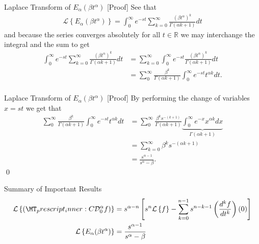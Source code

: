 \documentclass[pdf]{beamer}
\newcommand{\laplace}[1]{ \mathcal{L} \left\{ #1 \right\} }
\newcommand{\der}[3]{ \frac{d^{#3}#1}{d#2^{#3}} }
\newcommand{\capder}[3]{ \left( \prescript{C}{}{\mathcal{D}_{#1}^{#2}} #3 \right) }
\begin{document}
\begin{frame}{Laplace Transform of $E_\alpha(\beta t^\alpha)$ [Proof]}
See that
	\begin{align*}
		\laplace{ E_\alpha (\beta t^\alpha)} = \int_0^\infty e^{-st} \sum_{k=0}^\infty \frac{(\beta t^\alpha)^k}{\Gamma(\alpha k+1)} dt
	\end{align*}
	and because the series converges absolutely for all $ t \in \mathbb{R} $  we may interchange the integral
	and the sum to get
	\begin{align*}
		\int_0^\infty e^{-st} \sum_{k=0}^\infty \frac{(\beta t^\alpha)^k}{\Gamma(\alpha k+1)} dt &= \sum_{k=0}^\infty \int_0^\infty e^{-st} \frac{(\beta t^\alpha)^k}{\Gamma(\alpha k + 1)} dt \\
			&= \sum_0^\infty \frac{\beta^k}{\Gamma(\alpha k + 1)} \int_0^\infty e^{-st} t^{\alpha k} dt. \\
	\end{align*}
\end{frame}

\begin{frame}{Laplace Transform of $E_\alpha(\beta t^\alpha)$ [Proof]}
	By performing the change of variables $ x =st $ we get that 
	\begin{align*}
		\sum_0^\infty \frac{\beta^k}{\Gamma(\alpha k + 1)} \int_0^\infty e^{-st} t^{\alpha k} dt 
			&= \sum_0^\infty \frac{\beta^k s^{-(k+1)}}{\Gamma(\alpha k + 1)} \underbrace{\int_0^\infty e^{-x} x^{\alpha k} dx}_{\Gamma(\alpha k + 1)} \\
			&= \sum_{k=0}^\infty \beta^{k} s^{-(\alpha k + 1)} \\
			&= \frac{s^{\alpha-1}}{s^\alpha - \beta}.	
	\end{align*}
	\qed
\end{frame}

\begin{frame}{Summary of Important Results}
	\begin{align*}
		\laplace{\capder{0}{\alpha}{f}} &= s^{\alpha - n} \left[ s^n \laplace{f} - \sum_{k=0}^{n-1} s^{n-k-1} \left( \der{f}{t}{k} \right)(0) \right] \\
		\laplace{ E_\alpha (\beta t^\alpha)} &= \frac{s^{\alpha - 1}}{s^\alpha - \beta}
	\end{align*}
\end{frame}
\end{document}
